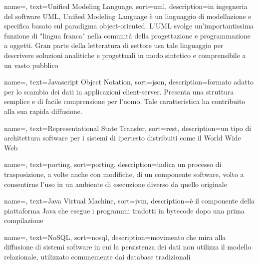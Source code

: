 {
    name=,
    text=Unified Modeling Language,
    sort=uml,
    description={in ingegneria del software UML, Unified Modeling Language è un linguaggio di modellazione e specifica basato sul paradigma object-oriented. L'UML svolge un’importantissima funzione di "lingua franca" nella comunità della progettazione e programmazione a oggetti. Gran parte della letteratura di settore usa tale linguaggio per descrivere soluzioni analitiche e progettuali in modo sintetico e comprensibile a un vasto pubblico}
}

{
    name=,
    text=Javascript Object Notation,
    sort=json,
    description={formato adatto per lo scambio dei dati in applicazioni client-server. Presenta una struttura semplice e di facile comprensione per l’uomo. Tale caratteristica ha contribuito alla sua rapida diffusione.}
}

{
    name=,
    text=Representational State Transfer,
    sort=rest,
    description={un tipo di architettura software per i sistemi di ipertesto distribuiti come il World Wide Web}
}

{
    name=,
    text=porting,
    sort=porting,
    description={indica un processo di trasposizione, a volte anche con modifiche, di un componente software, volto a consentirne l'uso in un ambiente di esecuzione diverso da quello originale}
}

{
    name=,
    text=Java Virtual Machine,
    sort=jvm,
    description={è il componente della piattaforma Java che esegue i programmi tradotti in bytecode dopo una prima compilazione}
}

{
    name=,
    text=NoSQL,
    sort=nosql,
    description={movimento che mira alla diffusione di sistemi software in cui la persistenza
dei dati non utilizza il modello relazionale, utilizzato comunemente dai
database tradizionali}
}
